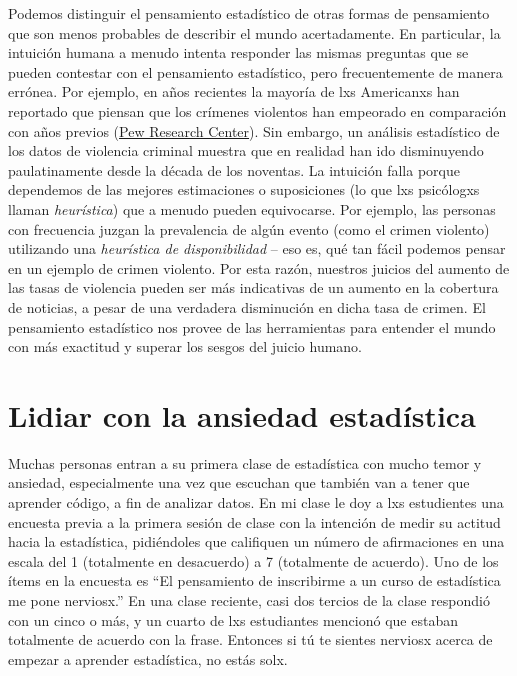 \documentclass[
  12pt,
]{book}
\begin{document}
Podemos distinguir el pensamiento estadístico de otras formas de pensamiento que son menos probables de describir el mundo acertadamente. En particular, la intuición humana a menudo intenta responder las mismas preguntas que se pueden contestar con el pensamiento estadístico, pero frecuentemente de manera errónea. Por ejemplo, en años recientes la mayoría de lxs Americanxs han reportado que piensan que los crímenes violentos han empeorado en comparación con años previos (\href{http://www.pewresearch.org/fact-tank/2018/01/30/5-facts-about-crime-in-the-u-s/}{Pew Research Center}). Sin embargo, un análisis estadístico de los datos de violencia criminal muestra que en realidad han ido disminuyendo paulatinamente desde la década de los noventas. La intuición falla porque dependemos de las mejores estimaciones o suposiciones (lo que lxs psicólogxs llaman \emph{heurística}) que a menudo pueden equivocarse. Por ejemplo, las personas con frecuencia juzgan la prevalencia de algún evento (como el crimen violento) utilizando una \emph{heurística de disponibilidad} -- eso es, qué tan fácil podemos pensar en un ejemplo de crimen violento. Por esta razón, nuestros juicios del aumento de las tasas de violencia pueden ser más indicativas de un aumento en la cobertura de noticias, a pesar de una verdadera disminución en dicha tasa de crimen. El pensamiento estadístico nos provee de las herramientas para entender el mundo con más exactitud y superar los sesgos del juicio humano.

\hypertarget{lidiar-con-la-ansiedad-estaduxedstica}{%
\section{Lidiar con la ansiedad estadística}\label{lidiar-con-la-ansiedad-estaduxedstica}}

Muchas personas entran a su primera clase de estadística con mucho temor y ansiedad, especialmente una vez que escuchan que también van a tener que aprender código, a fin de analizar datos. En mi clase le doy a lxs estudientes una encuesta previa a la primera sesión de clase con la intención de medir su actitud hacia la estadística, pidiéndoles que califiquen un número de afirmaciones en una escala del 1 (totalmente en desacuerdo) a 7 (totalmente de acuerdo). Uno de los ítems en la encuesta es ``El pensamiento de inscribirme a un curso de estadística me pone nerviosx.'' En una clase reciente, casi dos tercios de la clase respondió con un cinco o más, y un cuarto de lxs estudiantes mencionó que estaban totalmente de acuerdo con la frase. Entonces si tú te sientes nerviosx acerca de empezar a aprender estadística, no estás solx.
\end{document}
